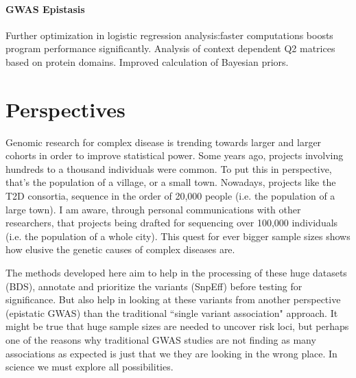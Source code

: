 \paragraph{GWAS Epistasis}
Further optimization in logistic regression analysis:faster computations boosts program performance significantly.
Analysis of context dependent Q2 matrices based on protein domains.
Improved calculation of Bayesian priors.

\section{Perspectives}

Genomic research for complex disease is trending towards larger and larger cohorts in order to improve statistical power. Some years ago, projects involving hundreds to a thousand individuals were common. To put this in perspective, that’s the population of a village, or a small town. Nowadays, projects like the T2D consortia, sequence in the order of 20,000 people (i.e. the population of a large town). I am aware, through personal communications with other researchers, that projects being drafted for sequencing over 100,000 individuals (i.e. the population of a whole city). This quest for ever bigger sample sizes shows how elusive the genetic causes of complex diseases are. 

The methods developed here aim to help in the processing of these huge datasets (BDS), annotate and prioritize the variants (SnpEff) before testing for significance. But also help in looking at these variants from another perspective (epistatic GWAS) than the traditional ``single variant association" approach. It might be true that huge sample sizes are needed to uncover risk loci, but perhaps one of the reasons why traditional GWAS studies are not finding as many associations as expected is just that we they are looking in the wrong place. In science we must explore all possibilities.


